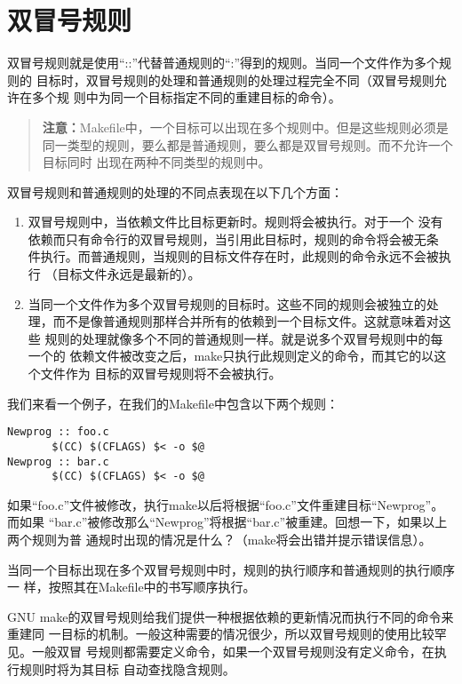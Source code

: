 \section{双冒号规则}
双冒号规则就是使用“::”代替普通规则的“:”得到的规则。当同一个文件作为多个规则的
目标时，双冒号规则的处理和普通规则的处理过程完全不同（双冒号规则允许在多个规
则中为同一个目标指定不同的重建目标的命令）。

\begin{quote}\kaishu
\textbf{注意：}Makefile中，一个目标可以出现在多个规则中。但是这些规则必须是
同一类型的规则，要么都是普通规则，要么都是双冒号规则。而不允许一个目标同时
出现在两种不同类型的规则中。
\end{quote}


双冒号规则和普通规则的处理的不同点表现在以下几个方面：
\begin{enumerate}
\itemsep=0pt \parskip=0pt
\item       双冒号规则中，当依赖文件比目标更新时。规则将会被执行。对于一个
    没有依赖而只有命令行的双冒号规则，当引用此目标时，规则的命令将会被无条
    件执行。而普通规则，当规则的目标文件存在时，此规则的命令永远不会被执行
    （目标文件永远是最新的）。
\item  当同一个文件作为多个双冒号规则的目标时。这些不同的规则会被独立的处
    理，而不是像普通规则那样合并所有的依赖到一个目标文件。这就意味着对这些
    规则的处理就像多个不同的普通规则一样。就是说多个双冒号规则中的每一个的
    依赖文件被改变之后，make只执行此规则定义的命令，而其它的以这个文件作为
    目标的双冒号规则将不会被执行。
\end{enumerate}

我们来看一个例子，在我们的Makefile中包含以下两个规则：
\begin{Verbatim}[]
Newprog :: foo.c
       $(CC) $(CFLAGS) $< -o $@
Newprog :: bar.c
       $(CC) $(CFLAGS) $< -o $@
\end{Verbatim}

如果“foo.c”文件被修改，执行make以后将根据“foo.c”文件重建目标“Newprog”。而如果
“bar.c”被修改那么“Newprog”将根据“bar.c”被重建。回想一下，如果以上两个规则为普
通规时出现的情况是什么？（make将会出错并提示错误信息）。

当同一个目标出现在多个双冒号规则中时，规则的执行顺序和普通规则的执行顺序一
样，按照其在Makefile中的书写顺序执行。

GNU make的双冒号规则给我们提供一种根据依赖的更新情况而执行不同的命令来重建同
一目标的机制。一般这种需要的情况很少，所以双冒号规则的使用比较罕见。一般双冒
号规则都需要定义命令，如果一个双冒号规则没有定义命令，在执行规则时将为其目标
自动查找隐含规则。

